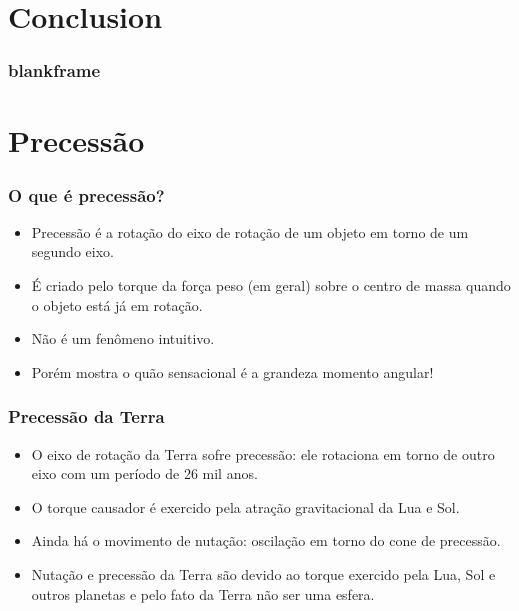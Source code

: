 \documentclass{beamer}
\begin{document}

\section[conclu]{Conclusion}

\begin{frame}\frametitle{blankframe} 

\end{frame}






\iffalse


\section{Precessão} 


\begin{frame}
\frametitle{O que é precessão?}
\begin{itemize}
\item Precessão é a rotação do eixo de rotação de um objeto em torno de um segundo eixo.
\item É criado pelo torque da força peso (em geral) sobre o centro de massa quando o objeto está já em rotação. 
\pause
\item Não é um fenômeno intuitivo.
\item Porém mostra o quão sensacional é a grandeza momento angular!
\end{itemize}
\end{frame}



\begin{frame}
\frametitle{Precessão da Terra}
\begin{itemize}
\item O eixo de rotação da Terra sofre precessão: ele rotaciona em torno de outro eixo com um período de 26 mil anos.
\item O torque causador é exercido pela atração gravitacional da Lua e Sol.
\pause
\item Ainda há o movimento de nutação: oscilação em torno do cone de precessão.
\item Nutação e precessão da Terra são devido ao torque exercido pela Lua, Sol e outros planetas e pelo fato da Terra não ser uma esfera.
\end{itemize}
\end{frame}
\end{document}
